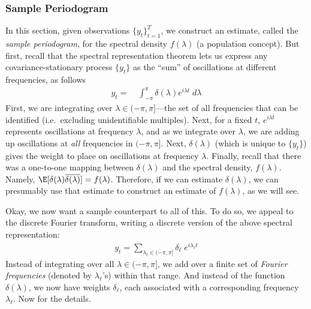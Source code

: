 \documentclass[12pt]{article}
\theoremstyle{plain}
\theoremstyle{definition}
\theoremstyle{remark}
\newcommand{\tT}{_{t=1}^T}
\begin{document}
\subsubsection{Sample Periodogram}

In this section, given observations $\{y_t\}\tT$, we construct an
estimate, called the \emph{sample periodogram}, for the spectral density
$f(\lambda)$ (a population concept).
But first, recall that the spectral representation theorem lets us
express any covariance-stationary process $\{y_t\}$ as the ``sum'' of
oscillations at different frequencies, as follows
\begin{align*}
  y_t =&\; \int_{-\pi}^\pi \delta(\lambda)e^{i\lambda t}\;d\lambda
\end{align*}
First, we are integrating over $\lambda\in(-\pi,\pi]$---the set of all
frequencies that can be identified (i.e.\ excluding unidentifiable
multiples). Next, for a fixed $t$, $e^{i\lambda t}$ represents
oscillations at frequency $\lambda$, and as we integrate over $\lambda$,
we are adding up oscillations at \emph{all} frequencies in $(-\pi,\pi]$.
Next, $\delta(\lambda)$ (which is unique to $\{y_t\}$) gives the weight
to place on oscillations at frequency $\lambda$.  Finally, recall that
there was a one-to-one mapping between $\delta(\lambda)$ and the
spectral density, $f(\lambda)$.  Namely,
$\E[\delta(\lambda)\overline{\delta(\lambda)}] = f(\lambda)$.
Therefore, if we can estimate $\delta(\lambda)$, we can presumably use
that estimate to construct an estimate of $f(\lambda)$, as we will see.

Okay, we now want a sample counterpart to all of this. To do so, we
appeal to the discrete Fourier transform, writing a discrete version of
the above spectral representation:
\begin{align}
  y_t =
  \sum_{\lambda_\ell\in (-\pi,\pi]} \delta_\ell \; e^{i\lambda_\ell t}
  \label{discretespectralrep}
\end{align}
Instead of integrating over all $\lambda\in(-\pi,\pi]$, we add over a
finite set of \emph{Fourier frequencies} (denoted by $\lambda_\ell$'s)
within that range. And instead of the function $\delta(\lambda)$, we now
have weights $\delta_\ell$, each associated with a corresponding
frequency $\lambda_\ell$. Now for the details.
\end{document}
